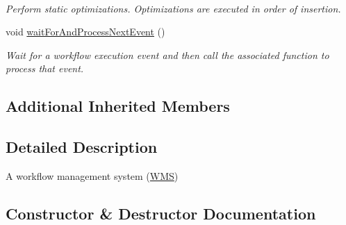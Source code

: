 \begin{DoxyCompactItemize}
$$\begin{DoxyCompactList}\small\item\em Perform static optimizations. Optimizations are executed in order of insertion. \end{DoxyCompactList}\item 
void \hyperlink{classwrench_1_1_w_m_s_a2923b4ec6f7e233693199154d5206d5f}{wait\+For\+And\+Process\+Next\+Event} ()
\begin{DoxyCompactList}\small\item\em Wait for a workflow execution event and then call the associated function to process that event. \end{DoxyCompactList}\end{DoxyCompactItemize}
\subsection*{Additional Inherited Members}


\subsection{Detailed Description}
A workflow management system (\hyperlink{classwrench_1_1_w_m_s}{W\+MS}) 

\subsection{Constructor \& Destructor Documentation}
\mbox{\label{classwrench_1_1_w_m_s_a385a87e02d2e6bd7e70624532bca3bdc}} 
